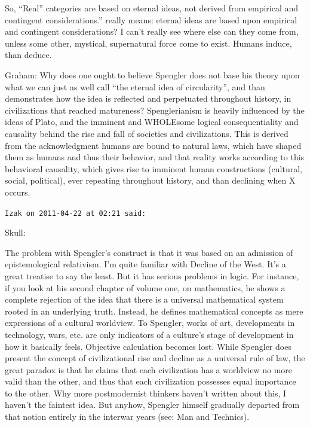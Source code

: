 \begin{footnotesize}
\begin{sffamily}
So, ``Real'' categories are based on eternal ideas, not derived from empirical and contingent considerations.'' really means: eternal ideas are based upon empirical and contingent considerations? I can't really see where else can they come from, unless some other, mystical, supernatural force come to exist. Humans induce, than deduce.

Graham: Why does one ought to believe Spengler does not base his theory upon what we can just as well call ``the eternal idea of circularity'', and than demonstrates how the idea is reflected and perpetuated throughout history, in civilizations that reached matureness? Spenglerianism is heavily influenced by the ideas of Plato, and the imminent and WHOLEsome logical consequentiality and causality behind the rise and fall of societies and civilizations. This is derived from the acknowledgment humans are bound to natural laws, which have shaped them as humans and thus their behavior, and that reality works according to this behavioral causality, which gives rise to imminent human constructions (cultural, social, political), ever repeating throughout history, and than declining when X occurs.

\hfill

\texttt{Izak on 2011-04-22 at 02:21 said:}

Skull:

The problem with Spengler's construct is that it was based on an admission of epistemological relativism. I'm quite familiar with Decline of the West. It's a great treatise to say the least. But it has serious problems in logic. For instance, if you look at his second chapter of volume one, on mathematics, he shows a complete rejection of the idea that there is a universal mathematical system rooted in an underlying truth. Instead, he defines mathematical concepts as mere expressions of a cultural worldview. To Spengler, works of art, developments in technology, wars, etc. are only indicators of a culture's stage of development in how it basically feels. Objective calculation becomes lost. While Spengler does present the concept of civilizational rise and decline as a universal rule of law, the great paradox is that he claims that each civilization has a worldview no more valid than the other, and thus that each civilization possesses equal importance to the other. Why more postmodernist thinkers haven't written about this, I haven't the faintest idea. But anyhow, Spengler himself gradually departed from that notion entirely in the interwar years (see: Man and Technics).


\end{sffamily}
\end{footnotesize}
